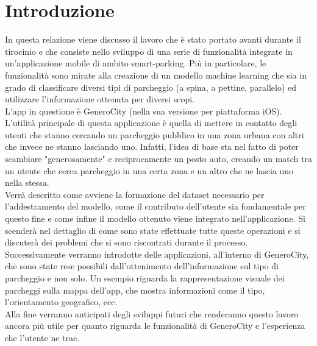 \chapter{Introduzione} 
In questa relazione viene discusso il lavoro che è stato
portato avanti durante il tirocinio e che consiste nello
sviluppo di una serie di funzionalità integrate in un'applicazione
mobile di ambito smart-parking. Più in particolare, le funzionalità
sono mirate alla creazione di un modello machine learning che
sia in grado di classificare diversi tipi di parcheggio (a spina,
a pettine, parallelo) ed utilizzare l'informazione ottenuta 
per diversi scopi.\\
L'app in questione è GeneroCity (nella sua versione per piattaforma
iOS). L'utilità principale di questa applicazione è quella di 
mettere in contatto degli utenti che stanno cercando un parcheggio
pubblico in una zona urbana con altri che invece ne stanno lasciando
uno. Infatti, l'idea di base sta nel fatto di poter scambiare
"generosamente" e reciprocamente un posto auto, creando un match tra un utente
che cerca parcheggio in una certa zona e un altro che ne lascia uno
nella stessa.\\
Verrà descritto come avviene la formazione del dataset necessario per
l'addestramento del modello, come il contributo dell'utente sia 
fondamentale per questo fine e come infine il modello ottenuto viene
integrato nell'applicazione. Si scenderà nel dettaglio di come sono
state effettuate tutte queste operazioni e si discuterà dei problemi
che si sono riscontrati durante il processo.\\
Successivamente verranno introdotte delle applicazioni, all'interno di 
GeneroCity, che sono state rese possibili dall'ottenimento 
dell'informazione sul tipo di parcheggio e non solo. Un esempio
riguarda la rappresentazione visuale dei parcheggi sulla mappa
dell'app, che mostra informazioni come il tipo, l'orientamento geografico, ecc.\\
Alla fine verranno anticipati degli sviluppi futuri che renderanno
questo lavoro ancora più utile per quanto riguarda le funzionalità
di GeneroCity e l'esperienza che l'utente ne trae.